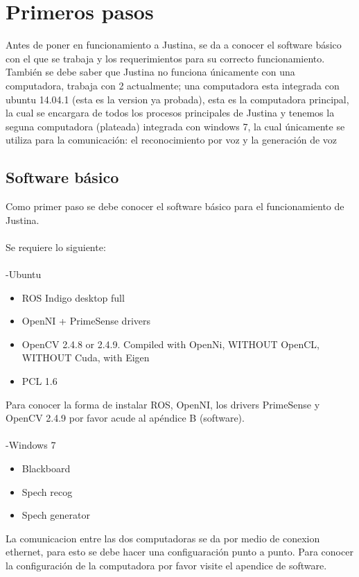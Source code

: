 \documentclass[user_manual.tex]{subfiles}
\begin{document}
 \chapter{Primeros pasos}
 \label{x}
 Antes de poner en funcionamiento a Justina, se da a conocer el software básico con el que se trabaja y los requerimientos para  su correcto funcionamiento. También se debe saber que Justina no funciona únicamente con una computadora, trabaja con 2 actualmente; una computadora esta integrada con ubuntu 14.04.1 (esta es la version ya probada), esta es la computadora principal, la cual se encargara de todos los procesos principales de Justina y tenemos la seguna computadora (plateada) integrada con windows 7, la cual únicamente se utiliza para la comunicación: el reconocimiento por voz y la generación de voz\\
 
 \section{Software básico}
Como primer paso se debe conocer el software básico para el funcionamiento de Justina.\\
\\
Se requiere lo siguiente:\\
\\
-Ubuntu
\begin{itemize}
\item ROS Indigo desktop full
\item OpenNI + PrimeSense drivers
\item OpenCV 2.4.8 or 2.4.9. Compiled with OpenNi, WITHOUT OpenCL, WITHOUT Cuda, with Eigen
\item PCL 1.6
\end{itemize}

Para conocer la forma de instalar ROS, OpenNI, los drivers PrimeSense y OpenCV 2.4.9 por favor acude al apéndice B (software).\\
\\
-Windows 7
\begin{itemize}
\item Blackboard
\item Spech recog
\item Spech generator
\end{itemize}

La comunicacion entre las dos computadoras se da por medio de conexion ethernet, para esto se debe hacer una configuaración punto a punto. Para conocer la configuración de la computadora por favor visite el apendice de software.
\end{document}
